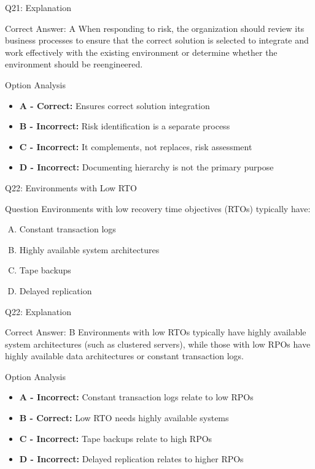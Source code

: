 \documentclass{beamer}
\begin{document}
	\begin{frame}{Q21: Explanation}
		\begin{block}{Correct Answer: A}
			When responding to risk, the organization should review its business processes to ensure that the correct solution is selected to integrate and work effectively with the existing environment or determine whether the environment should be reengineered.
		\end{block}
		\begin{block}{Option Analysis}
			\begin{itemize}
				\item \textbf{A - Correct:} Ensures correct solution integration
				\item \textbf{B - Incorrect:} Risk identification is a separate process
				\item \textbf{C - Incorrect:} It complements, not replaces, risk assessment
				\item \textbf{D - Incorrect:} Documenting hierarchy is not the primary purpose
			\end{itemize}
		\end{block}
	\end{frame}
	
	\begin{frame}{Q22: Environments with Low RTO}
		\begin{block}{Question}
			Environments with low recovery time objectives (RTOs) typically have:
		\end{block}
		\begin{enumerate}[(A)]
			\item Constant transaction logs
			\item Highly available system architectures
			\item Tape backups
			\item Delayed replication
		\end{enumerate}
	\end{frame}
	
	\begin{frame}{Q22: Explanation}
		\begin{block}{Correct Answer: B}
			Environments with low RTOs typically have highly available system architectures (such as clustered servers), while those with low RPOs have highly available data architectures or constant transaction logs.
		\end{block}
		\begin{block}{Option Analysis}
			\begin{itemize}
				\item \textbf{A - Incorrect:} Constant transaction logs relate to low RPOs
				\item \textbf{B - Correct:} Low RTO needs highly available systems
				\item \textbf{C - Incorrect:} Tape backups relate to high RPOs
				\item \textbf{D - Incorrect:} Delayed replication relates to higher RPOs
			\end{itemize}
		\end{block}
	\end{frame}
	
\end{document}
